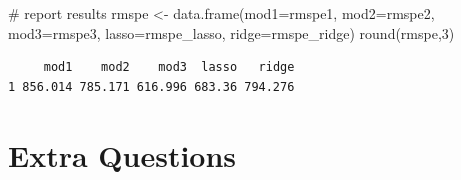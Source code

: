 \documentclass[
  letterpaper,
  DIV=11,
  numbers=noendperiod]{scrreprt}
\newenvironment{Shaded}{\begin{snugshade}}{\end{snugshade}}
\newcommand{\AttributeTok}[1]{\textcolor[rgb]{0.40,0.45,0.13}{#1}}
\newcommand{\CommentTok}[1]{\textcolor[rgb]{0.37,0.37,0.37}{#1}}
\newcommand{\DecValTok}[1]{\textcolor[rgb]{0.68,0.00,0.00}{#1}}
\newcommand{\FunctionTok}[1]{\textcolor[rgb]{0.28,0.35,0.67}{#1}}
\newcommand{\NormalTok}[1]{\textcolor[rgb]{0.00,0.23,0.31}{#1}}
\newcommand{\OtherTok}[1]{\textcolor[rgb]{0.00,0.23,0.31}{#1}}
\begin{document}
\begin{Shaded}
\begin{Highlighting}[]
\CommentTok{\# report results}
\NormalTok{rmspe }\OtherTok{\textless{}{-}} \FunctionTok{data.frame}\NormalTok{(}\AttributeTok{mod1=}\NormalTok{rmspe1, }\AttributeTok{mod2=}\NormalTok{rmspe2, }\AttributeTok{mod3=}\NormalTok{rmspe3, }\AttributeTok{lasso=}\NormalTok{rmspe\_lasso, }\AttributeTok{ridge=}\NormalTok{rmspe\_ridge)}
\FunctionTok{round}\NormalTok{(rmspe,}\DecValTok{3}\NormalTok{)}
\end{Highlighting}
\end{Shaded}

\begin{verbatim}
     mod1    mod2    mod3  lasso   ridge
1 856.014 785.171 616.996 683.36 794.276
\end{verbatim}

\section{Extra Questions}\label{extra-questions-3}
\end{document}
